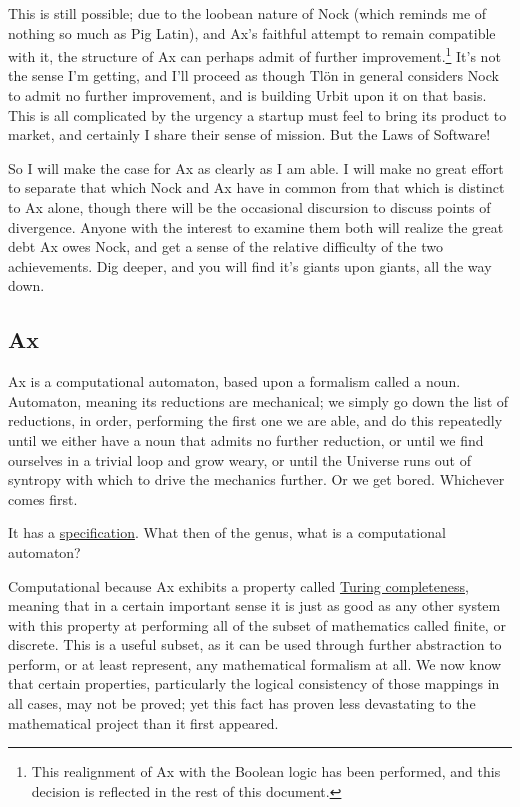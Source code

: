 \documentclass[twoside]{article}
\begin{document}
This is still possible; due to the loobean nature of Nock (which reminds me of nothing so much as Pig Latin), and Ax's faithful attempt to remain compatible with it, the structure of Ax can perhaps admit of further improvement.\footnote{This realignment of Ax with the Boolean logic has been performed, and this decision is reflected in the rest of this document.} It's not the sense I'm getting, and I'll proceed as though Tlön in general considers Nock to admit no further improvement, and is building Urbit upon it on that basis. This is all complicated by the urgency a startup must feel to bring its product to market, and certainly I share their sense of mission. But the Laws of Software!

So I will make the case for Ax as clearly as I am able. I will make no great effort to separate that which Nock and Ax have in common from that which is distinct to Ax alone, though there will be the occasional discursion to discuss points of divergence. Anyone with the interest to examine them both will realize the great debt Ax owes Nock, and get a sense of the relative difficulty of the two achievements. Dig deeper, and you will find it's giants upon giants, all the way down.

\subsection{Ax}

Ax is a computational automaton, based upon a formalism called a noun. Automaton, meaning its reductions are mechanical; we simply go down the list of reductions, in order, performing the first one we are able, and do this repeatedly until we either have a noun that admits no further reduction, or until we find ourselves in a trivial loop and grow weary, or until the Universe runs out of syntropy with which to drive the mechanics further. Or we get bored. Whichever comes first.

It has a \href{https://github.com/mnemnion/ax/blob/master/ax%20spec.md}{specification}. What then of the genus, what is a computational automaton?

Computational because Ax exhibits a property called \href{https://en.wikipedia.org/wiki/Turing_completeness}{Turing completeness}, meaning that in a certain important sense it is just as good as any other system with this property at performing all of the subset of mathematics called finite, or discrete. This is a useful subset, as it can be used through further abstraction to perform, or at least represent, any mathematical formalism at all. We now know that certain properties, particularly the logical consistency of those mappings in all cases, may not be proved; yet this fact has proven less devastating to the mathematical project than it first appeared.
\end{document}
